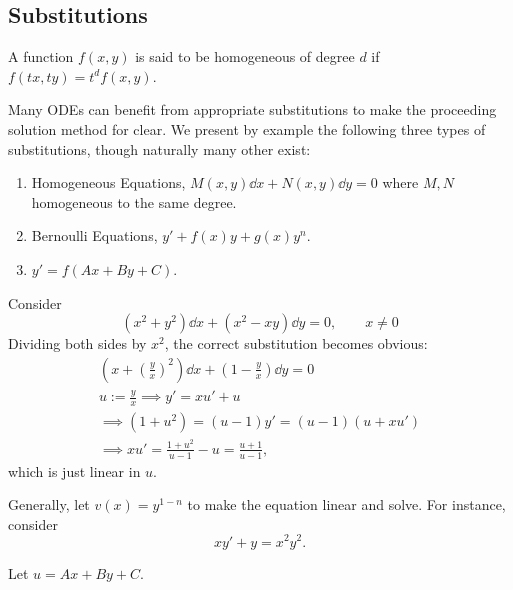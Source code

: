 \subsection{Substitutions}

\begin{definition}[Homogeneous]
    A function $f(x,y)$ is said to be homogeneous of degree $d$ if $f(tx, ty) = t^df(x,y)$.
\end{definition}
    Many ODEs can benefit from appropriate substitutions to make the proceeding solution method for clear. We present by example the following three types of substitutions, though naturally many other exist:
    \begin{enumerate}
        \item Homogeneous Equations, $M(x, y) \dd{x} + N(x, y)\dd{y} = 0$ where $M, N$ homogeneous to the same degree.
        \item Bernoulli Equations, $y' + f(x)y + g(x)y^n$.
        \item $y' = f(Ax + By + C)$.
    \end{enumerate}

\begin{example}
    Consider \[
    (x^2 + y^2)\dd{x} + (x^2 - xy)\dd{y} = 0    , \qquad x \neq 0
    \]
    Dividing both sides by $x^2$, the correct substitution becomes obvious:
    \begin{align*}
        (x +(\frac{y}{x})^2) \dd{x} + (1 - \frac{y}{x})\dd{y}= 0\\
        u := \frac{y}{x} \implies y' = xu' + u\\
        \implies (1 + u^2) = (u - 1)y' = (u -1)(u + x u')\\
         \implies xu' =  \frac{1 + u^2}{u-1}-u = \frac{u+1}{u-1},
    \end{align*}
    which is just linear in $u$.
\end{example}

\begin{example}
    Generally, let $v(x) = y^{1-n}$ to make the equation linear and solve. For instance, consider \[
    x y' + y = x^2 y^2.
    \]
\end{example}
\begin{example}[3. $f(Ax + By + C)$]
    Let $u = Ax + By + C$.
\end{example}